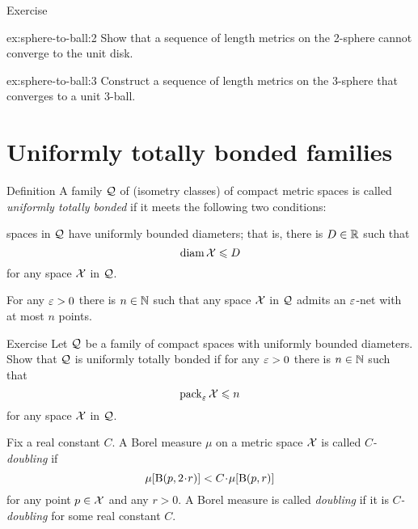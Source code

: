 \begin{thm}{Exercise}\label{ex:sphere-to-ball}
\begin{subthm}{ex:sphere-to-ball:2}
Show that a sequence of length metrics on the 2-sphere cannot converge to the unit disk.
\end{subthm}

\begin{subthm}{ex:sphere-to-ball:3}
Construct a sequence of length metrics on the 3-sphere that converges to a unit 3-ball.
\end{subthm}

\end{thm}

\section{Uniformly totally bonded families}

\begin{thm}{Definition}\label{def:utb}
A family $\mathcal{Q}$ of (isometry classes) of compact metric spaces is called  \emph{uniformly totally bonded} if it meets the following two conditions:

\begin{subthm}{}
spaces in $\mathcal{Q}$ have uniformly bounded diameters; that is, there is $D\in\mathbb{R}$ such that
\[\operatorname{\rm diam}\nolimits\mathcal{X}\leqslant D\]
for any space $\mathcal{X}$ in $\mathcal{Q}$.
\end{subthm}

\begin{subthm}{}
For any $\varepsilon>0$ there is $n\in\mathbb{N}$ such that any space $\mathcal{X}$ in $\mathcal{Q}$ admits an $\varepsilon$-net with at most $n$ points.
\end{subthm}
\end{thm}

\begin{thm}{Exercise}\label{ex:utb+pack}
Let $\mathcal{Q}$ be a family of compact spaces with uniformly bounded diameters.
Show that $\mathcal{Q}$ is uniformly totally bonded if for any $\varepsilon>0$ there is $n\in\mathbb{N}$ such that 
\[\operatorname{\rm pack}\nolimits_\varepsilon\mathcal{X}\leqslant n\]
for any space $\mathcal{X}$ in $\mathcal{Q}$.
\end{thm}


Fix a real constant $C$.
A Borel measure $\mu$ on a metric space $\mathcal{X}$ is called \emph{$C$-doubling} if
\[\mu[\oBall(p,2\cdot r)]< C\cdot\mu[\oBall(p,r)]\]
for any point $p\in \mathcal{X}$ and any $r>0$.
A Borel measure is called \emph{doubling} if it is {}\emph{$C$-doubling} for some real constant $C$.


